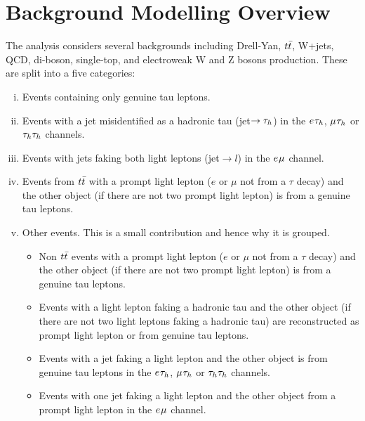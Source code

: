 \newpage
\section{Background Modelling Overview}
\label{sec:background_modelling}

The analysis considers several backgrounds including Drell-Yan, $t\bar{t}$, W+jets, QCD, di-boson, single-top, and electroweak W and Z bosons production.
These are split into a five categories:
\begin{enumerate}[i)]
  \item Events containing only genuine tau leptons.
  \item Events with a jet misidentified as a hadronic tau (jet$\rightarrow \tau_{h}$) in the $e_{}\tau_{h}$, $\mu_{}\tau_{h}$ or $\tau_{h}\tau_{h}$ channels.
  \item Events with jets faking both light leptons (jet$\rightarrow l$) in the $e_{}\mu_{}$ channel.
  \item Events from $t\bar{t}$ with a prompt light lepton ($e$ or $\mu$ not from a $\tau$ decay) and the other object (if there are not two prompt light lepton) is from a genuine tau leptons.
  \item Other events. This is a small contribution and hence why it is grouped.
  \begin{itemize}
    \item Non $t\bar{t}$ events with a prompt light lepton ($e$ or $\mu$ not from a $\tau$ decay) and the other object (if there are not two prompt light lepton) is from a genuine tau leptons.
    \item Events with a light lepton faking a hadronic tau and the other object (if there are not two light leptons faking a hadronic tau) are reconstructed as prompt light lepton or from genuine tau leptons. 
    \item Events with a jet faking a light lepton and the other object is from genuine tau leptons in the $e_{}\tau_{h}$, $\mu_{}\tau_{h}$ or $\tau_{h}\tau_{h}$ channels.
    \item Events with one jet faking a light lepton and the other object from a prompt light lepton in the $e_{}\mu_{}$ channel.
   \end{itemize}
\end{enumerate}

